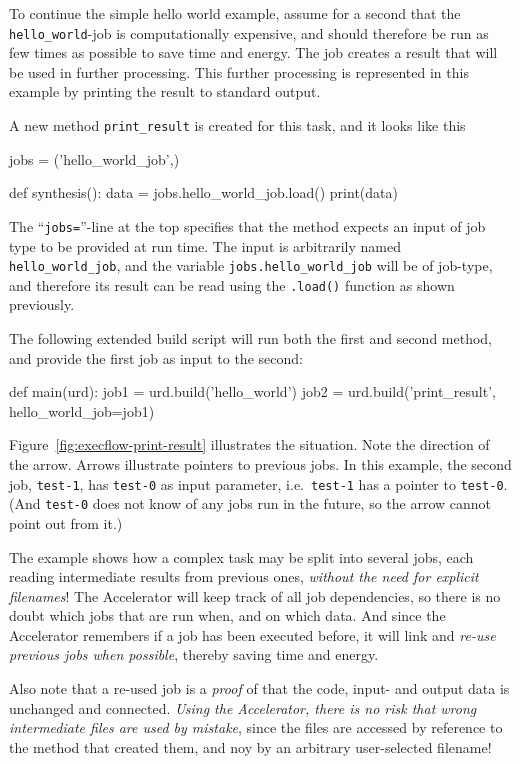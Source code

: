 To continue the simple hello world example, assume for a second that
the \texttt{hello\_world}-job is computationally expensive, and should
therefore be run as few times as possible to save time and energy.
The job creates a result that will be used in further processing.
This further processing is represented in this example by printing the
result to standard output.

\clearpage

\noindent A new method \texttt{print\_result} is
created for this task, and it looks like this
\begin{python}
jobs = ('hello_world_job',)

def synthesis():
    data = jobs.hello_world_job.load() 
    print(data)
\end{python}
The ``\texttt{jobs=}''-line at the top specifies that the method
expects an input of job type to be provided at run time.  The input is
arbitrarily named \texttt{hello\_world\_job}, and the variable
\texttt{jobs.hello\_world\_job} will be of job-type, and therefore its
result can be read using the \texttt{.load()} function as shown
previously.

The following extended build script will run both the first and second
method, and provide the first job as input to the second:
\begin{python}
def main(urd):
    job1 = urd.build('hello_world')
    job2 = urd.build('print_result', hello_world_job=job1)
\end{python}

Figure~\ref{fig:execflow-print-result} illustrates the situation.
Note the direction of the arrow.  Arrows illustrate pointers to
previous jobs.  In this example, the second job, \texttt{test-1}, has
\texttt{test-0} as input parameter, i.e.\ \texttt{test-1} has a
pointer to \texttt{test-0}.  (And \texttt{test-0} does not know of any
jobs run in the future, so the arrow cannot point out from it.)

The example shows how a complex task may be split into several jobs,
each reading intermediate results from previous ones, \emph{without
the need for explicit filenames}!  The Accelerator will keep track of
all job dependencies, so there is no doubt which jobs that are run
when, and on which data.  And since the Accelerator remembers if a job
has been executed before, it will link and \emph{re-use previous jobs
when possible}, thereby saving time and energy.

Also note that a re-used job is a \emph{proof} of that the code,
input- and output data is unchanged and connected.  \emph{Using the
Accelerator, there is no risk that wrong intermediate files are used
by mistake}, since the files are accessed by reference to the method
that created them, and noy by an arbitrary user-selected filename!


